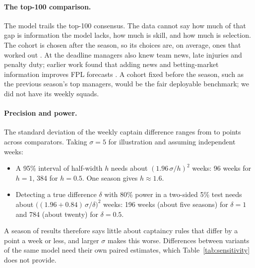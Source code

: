 \documentclass[11pt,a4paper]{article}
\begin{document}
\paragraph{The top-100 comparison.} The model trails the top-100 consensus. The data cannot say
how much of that gap is information the model lacks, how much is skill, and how much is selection.
The cohort is chosen after the season, so its choices are, on average, ones that worked out
\citep{brown1992}. At the deadline managers also knew team news, late injuries and penalty duty;
earlier work found that adding news and betting-market information improves FPL forecasts
\citep{bonello2019}. A cohort fixed before the season, such as the previous season's top managers,
would be the fair deployable benchmark; we did not have its weekly squads.

\paragraph{Precision and power.} The standard deviation of the weekly captain difference ranges
from \sdMin{} to \sdMax{} points across comparators. Taking $\sigma=5$ for illustration and assuming
independent weeks:
\begin{itemize}
  \item A 95\% interval of half-width $h$ needs about $(1.96\,\sigma/h)^2$ weeks: 96 weeks for $h=1$,
        384 for $h=0.5$. One season gives $h\approx1.6$.
  \item Detecting a true difference $\delta$ with 80\% power in a two-sided 5\% test needs about
        $\bigl((1.96+0.84)\,\sigma/\delta\bigr)^2$ weeks: 196 weeks (about five seasons) for
        $\delta=1$ and 784 (about twenty) for $\delta=0.5$.
\end{itemize}
A season of results therefore says little about captaincy rules that differ by a point a week or
less, and larger $\sigma$ makes this worse. Differences between variants of the same model need their own paired estimates, which
Table~\ref{tab:sensitivity} does not provide.
\end{document}
